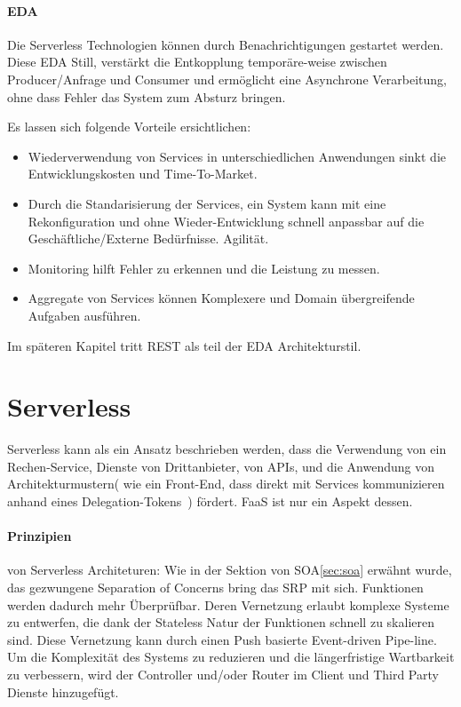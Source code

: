 \documentclass[
12pt,
english,
ngerman,
headsepline,
twoside,
openright,
numbers=noenddot,version=first
]{scrreprt}
\begin{document}
\paragraph{EDA}

Die Serverless Technologien können durch Benachrichtigungen gestartet werden. Diese \acrfull{EDA} Still, verstärkt die Entkopplung temporäre-weise zwischen Producer/Anfrage und Consumer und ermöglicht eine Asynchrone Verarbeitung, ohne dass Fehler das System zum Absturz bringen.


Es lassen sich folgende Vorteile ersichtlichen:
\begin{itemize}
	\item Wiederverwendung von Services in unterschiedlichen Anwendungen sinkt die Entwicklungskosten und Time-To-Market.
	\item Durch die Standarisierung der Services, ein System kann mit eine Rekonfiguration und ohne Wieder-Entwicklung schnell anpassbar auf die Geschäftliche/Externe Bedürfnisse. Agilität.
	\item Monitoring hilft Fehler zu erkennen und die Leistung zu messen.
	\item Aggregate von Services können Komplexere und Domain übergreifende Aufgaben ausführen.
\end{itemize}
Im späteren Kapitel tritt REST als teil der \acrshort{EDA} Architekturstil.


\section{Serverless}
\label{sec:serverless}

Serverless kann als ein Ansatz beschrieben werden, dass  die Verwendung von ein Rechen-Service, Dienste von Drittanbieter, von \acrfull{API}s, und die Anwendung von Architekturmustern( wie ein Front-End, dass direkt mit Services kommunizieren anhand eines \glqq Delegation-Tokens\grqq\ ) fördert. \acrshort{FaaS} ist nur ein Aspekt dessen.



\paragraph{Prinzipien}\label{par:serverless-principles} von Serverless Architeturen: \cite{serverlessArchAWS}
Wie in der Sektion von \acrshort{SOA}\ref{sec:soa} erwähnt wurde, das gezwungene Separation of Concerns bring das \acrfull{SRP} mit sich. Funktionen werden dadurch mehr Überprüfbar.
Deren Vernetzung erlaubt komplexe Systeme zu entwerfen, die dank der Stateless Natur der Funktionen schnell zu skalieren sind.
Diese Vernetzung kann durch einen Push basierte Event-driven Pipe-line.
Um die Komplexität des Systems zu reduzieren und die längerfristige Wartbarkeit zu verbessern, wird der Controller und/oder Router im Client und Third Party Dienste hinzugefügt.
\end{document}
